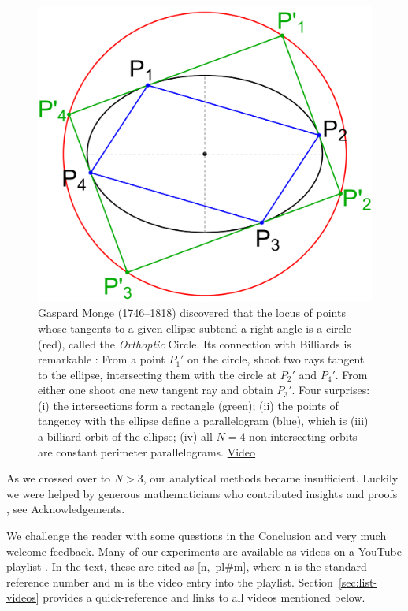 %
\begin{figure}[ht]
    \centering
    \includegraphics[width=.5\textwidth]{pics/u0200_monge_orthoptic.pdf}
    \caption{Gaspard Monge (1746--1818) discovered that the locus of points whose tangents to a given ellipse subtend a right angle is a circle (red), called the {\em Orthoptic} Circle. Its connection with Billiards is remarkable \cite{connes07}: From a point $P_1'$ on the circle, shoot two rays tangent to the ellipse, intersecting them with the circle at $P_2'$ and $P_4'$. From either one shoot one new tangent ray and obtain $P_3'$. Four surprises: (i) the intersections form a rectangle (green); (ii) the points of tangency with the ellipse define a parallelogram (blue), which is (iii) a billiard orbit of the ellipse; (iv) all $N=4$ non-intersecting orbits are constant perimeter parallelograms. 
    \href{https://youtu.be/9fI3iM2jrmI}{Video} \cite[pl\#5]{dsr_math_intell_playlist}}    \label{fig:monge-orthoptic}
\end{figure}

As we crossed over to $N>3$, our analytical methods became insufficient. Luckily we were helped by generous mathematicians who contributed insights and proofs \cite{akopyan19_private_meromorphic,helman19,dominique19,olga19_mitten,sergei19_private_circles,sergei19_private_meromorphic}, see Acknowledgements. 

We challenge the reader with some questions in the Conclusion and very much welcome feedback. Many of our experiments are available as videos on a YouTube \href{https://bit.ly/2kTvPPr}{playlist} \cite{dsr_math_intell_playlist}. In the text, these are cited as {[n,~pl\#m]}, where n is the standard reference number and m is the video entry into the playlist. Section~\ref{sec:list-videos} provides a quick-reference and links to all videos mentioned below.